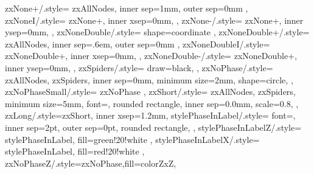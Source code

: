 {{    zxNone+/.style={
      zxAllNodes,
      inner sep=1mm,
      outer sep=0mm
    },
    zxNoneI/.style={
      zxNone+,
      inner xsep=0mm,
    },
    zxNone-/.style={
      zxNone+,
      inner ysep=0mm,
    },
    zxNoneDouble/.style={
      shape=coordinate
    },
    zxNoneDouble+/.style={
      zxAllNodes,
      inner sep=.6em,
      outer sep=0mm
    },
    zxNoneDoubleI/.style={
      zxNoneDouble+,
      inner xsep=0mm,
    },
    zxNoneDouble-/.style={
      zxNoneDouble+,
      inner ysep=0mm,
    },
    zxSpiders/.style={
      draw=black,
    },
    zxNoPhase/.style={
      zxAllNodes,
      zxSpiders,
      inner sep=0mm,
      minimum size=2mm,
      shape=circle,
    },
    zxNoPhaseSmall/.style={
      zxNoPhase
    },
    zxShort/.style={
      zxAllNodes,
      zxSpiders,
      minimum size=5mm,
      font={\fontsize{8}{10}\selectfont\boldmath},
      rounded rectangle,
      inner sep=0.0mm,
      scale=0.8,
    }, %
    zxLong/.style={zxShort, inner xsep=1.2mm},
    stylePhaseInLabel/.style={
      font={\fontsize{8}{10}\selectfont\boldmath},
      inner sep=2pt,
      outer sep=0pt,
      rounded rectangle,
    },
    stylePhaseInLabelZ/.style={
      stylePhaseInLabel,
      fill=green!20!white
    },
    stylePhaseInLabelX/.style={
      stylePhaseInLabel,
      fill=red!20!white
    },
    zxNoPhaseZ/.style={zxNoPhase,fill=colorZxZ},
}}
